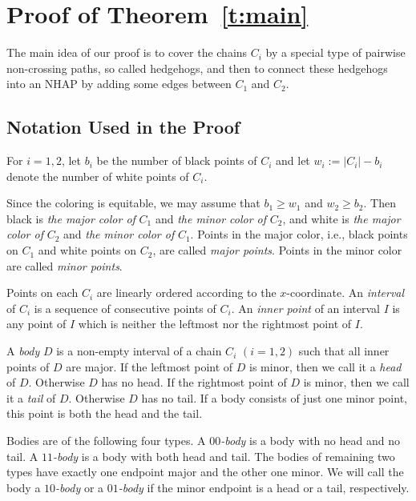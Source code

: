 \documentclass[12pt]{article}
\newcommand{\myfig}[2]  {\onefigure{{g-#1.eps}}{\label{f:#1} #2} }
\begin{document}
\section{Proof of Theorem~\ref{t:main}}\label{s:mainthm}

The main idea of our proof is to cover the chains $C_i$ by a special type of
pairwise non-crossing paths, so called
hedgehogs, and then to connect these hedgehogs into an NHAP by adding some
edges between $C_1$ and $C_2$.

\subsection{Notation Used in the Proof}

For $i=1,2$, let $b_i$ be the number of black points of $C_i$ and
let $w_i:=|C_i|- b_i$ denote the number of white points of
$C_i$. 

Since the coloring is equitable, we may assume that 
$b_1 \ge w_1$ and $w_2 \ge b_2$.
Then black is {\em the major color of} $C_1$ and
{\em the minor color of} $C_2$, and white is {\em the major color
of} $C_2$ and {\em the minor color of} $C_1$. Points in the major
color, i.e., black points on $C_1$ and white points on $C_2$, are
called {\em major points}. Points in the minor color are called
{\em minor points}.

Points on each $C_i$ are linearly ordered according to the $x$-coordinate.
An {\em interval\/} of $C_i$ is a sequence of consecutive points of $C_i$.
An {\em inner point\/} of an interval $I$ is any point of $I$ which is
neither the leftmost nor the rightmost point of $I$.

\myfig{hedgehog}{a hedgehog in $C_1$}

A {\em body} $D$ is a non-empty interval of a chain $C_i$ $(i=1,2)$
such that all inner points of $D$ are major.
If the leftmost point of $D$ is minor, then we call it a {\em head\/}
of $D$. Otherwise $D$ has no head. If the rightmost point of $D$
is minor, then we call it a {\em tail\/} of $D$. Otherwise $D$ has no tail.
If a body consists of just one minor point, this point is both the head
and the tail.

Bodies are of the following four types. A {\em $00$-body\/} is a body with
no head and no tail. A {\em $11$-body\/} is a body with both head
and tail. The bodies of remaining two types have exactly one endpoint major
and the other one minor. We will call the body a {\em $10$-body\/} or
a {\em $01$-body\/} if the minor endpoint is a head or a tail, respectively.
\end{document}
